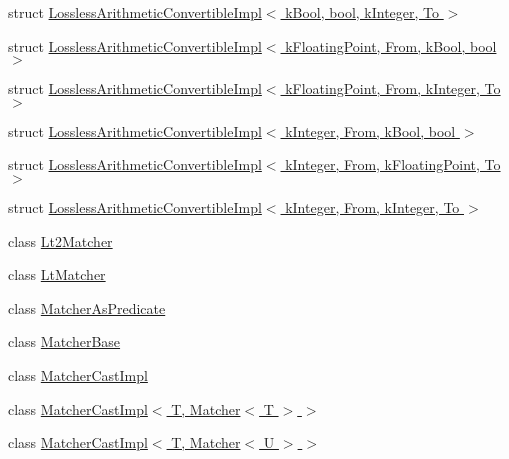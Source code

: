 \begin{DoxyCompactItemize}
\item 
struct \hyperlink{structtesting_1_1internal_1_1LosslessArithmeticConvertibleImpl_3_01kBool_00_01bool_00_01kInteger_00_01To_01_4}{Lossless\+Arithmetic\+Convertible\+Impl$<$ k\+Bool, bool, k\+Integer, To $>$}
\item 
struct \hyperlink{structtesting_1_1internal_1_1LosslessArithmeticConvertibleImpl_3_01kFloatingPoint_00_01From_00_01kBool_00_01bool_01_4}{Lossless\+Arithmetic\+Convertible\+Impl$<$ k\+Floating\+Point, From, k\+Bool, bool $>$}
\item 
struct \hyperlink{structtesting_1_1internal_1_1LosslessArithmeticConvertibleImpl_3_01kFloatingPoint_00_01From_00_01kInteger_00_01To_01_4}{Lossless\+Arithmetic\+Convertible\+Impl$<$ k\+Floating\+Point, From, k\+Integer, To $>$}
\item 
struct \hyperlink{structtesting_1_1internal_1_1LosslessArithmeticConvertibleImpl_3_01kInteger_00_01From_00_01kBool_00_01bool_01_4}{Lossless\+Arithmetic\+Convertible\+Impl$<$ k\+Integer, From, k\+Bool, bool $>$}
\item 
struct \hyperlink{structtesting_1_1internal_1_1LosslessArithmeticConvertibleImpl_3_01kInteger_00_01From_00_01kFloatingPoint_00_01To_01_4}{Lossless\+Arithmetic\+Convertible\+Impl$<$ k\+Integer, From, k\+Floating\+Point, To $>$}
\item 
struct \hyperlink{structtesting_1_1internal_1_1LosslessArithmeticConvertibleImpl_3_01kInteger_00_01From_00_01kInteger_00_01To_01_4}{Lossless\+Arithmetic\+Convertible\+Impl$<$ k\+Integer, From, k\+Integer, To $>$}
\item 
class \hyperlink{classtesting_1_1internal_1_1Lt2Matcher}{Lt2\+Matcher}
\item 
class \hyperlink{classtesting_1_1internal_1_1LtMatcher}{Lt\+Matcher}
\item 
class \hyperlink{classtesting_1_1internal_1_1MatcherAsPredicate}{Matcher\+As\+Predicate}
\item 
class \hyperlink{classtesting_1_1internal_1_1MatcherBase}{Matcher\+Base}
\item 
class \hyperlink{classtesting_1_1internal_1_1MatcherCastImpl}{Matcher\+Cast\+Impl}
\item 
class \hyperlink{classtesting_1_1internal_1_1MatcherCastImpl_3_01T_00_01Matcher_3_01T_01_4_01_4}{Matcher\+Cast\+Impl$<$ T, Matcher$<$ T $>$ $>$}
\item 
class \hyperlink{classtesting_1_1internal_1_1MatcherCastImpl_3_01T_00_01Matcher_3_01U_01_4_01_4}{Matcher\+Cast\+Impl$<$ T, Matcher$<$ U $>$ $>$}
\item 

\end{DoxyCompactItemize}
